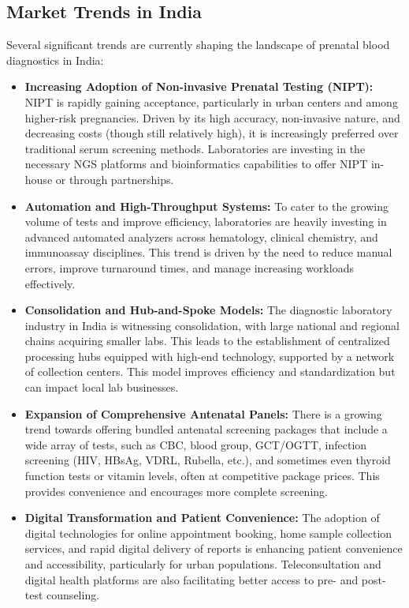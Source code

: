 \documentclass{article}
\begin{document}
{\subsection{Market Trends in India}

Several significant trends are currently shaping the landscape of prenatal blood diagnostics in India:
\begin{itemize}
    \item \textbf{Increasing Adoption of Non-invasive Prenatal Testing (NIPT):} NIPT is rapidly gaining acceptance, particularly in urban centers and among higher-risk pregnancies. Driven by its high accuracy, non-invasive nature, and decreasing costs (though still relatively high), it is increasingly preferred over traditional serum screening methods. Laboratories are investing in the necessary NGS platforms and bioinformatics capabilities to offer NIPT in-house or through partnerships.
    \item \textbf{Automation and High-Throughput Systems:} To cater to the growing volume of tests and improve efficiency, laboratories are heavily investing in advanced automated analyzers across hematology, clinical chemistry, and immunoassay disciplines. This trend is driven by the need to reduce manual errors, improve turnaround times, and manage increasing workloads effectively.
    \item \textbf{Consolidation and Hub-and-Spoke Models:} The diagnostic laboratory industry in India is witnessing consolidation, with large national and regional chains acquiring smaller labs. This leads to the establishment of centralized processing hubs equipped with high-end technology, supported by a network of collection centers. This model improves efficiency and standardization but can impact local lab businesses.
    \item \textbf{Expansion of Comprehensive Antenatal Panels:} There is a growing trend towards offering bundled antenatal screening packages that include a wide array of tests, such as CBC, blood group, GCT/OGTT, infection screening (HIV, HBsAg, VDRL, Rubella, etc.), and sometimes even thyroid function tests or vitamin levels, often at competitive package prices. This provides convenience and encourages more complete screening.
    \item \textbf{Digital Transformation and Patient Convenience:} The adoption of digital technologies for online appointment booking, home sample collection services, and rapid digital delivery of reports is enhancing patient convenience and accessibility, particularly for urban populations. Teleconsultation and digital health platforms are also facilitating better access to pre- and post-test counseling.

\end{itemize}}
\end{document}
